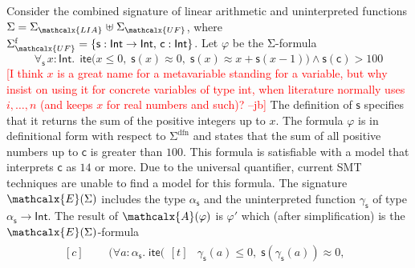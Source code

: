 \documentclass[runningheads,a4paper]{llncs}
\newcommand{\con}[1]{\mathsf{#1}}
\let\const=\con
\let\oldSigma=\Sigma
\def\Sigma{\mathrm{\oldSigma}}
\let\oldwedge=\wedge
\def\wedge{\mathrel{\oldwedge}}
\newcommand{\teq}{\approx}
\newcommand{\conv}{\mathcalx{A}}
\newcommand{\stypes}[1]{#1^\mathrm{ty}}
\newcommand{\sfuns}[1]{#1^\mathrm{f}}
\newcommand{\sfundefs}[1]{#1^\mathrm{dfn}}
\newcommand{\typeint}{\ty{Int}}
\newcommand\ty[1]{\con{#1}}
\newcommand{\lite}{\con{ite}}
\newcommand\concret{\gamma} %
\newcommand{\forallf}[1]{\forall_{\!#1\:}}
\newcommand{\farg}[1]{\concret_{#1}}
\newcommand{\fargtype}[1]{\alpha_{#1}}
\newcommand{\Sigmalia}{\Sigma_{\mathcalx{LIA}}}
\newcommand{\extendsig}[1]{\mathcalx{E}( #1 )}
\newcommand{\rem}[1]{\textcolor{red}{[#1]}}
\newcommand{\jb}[1]{\rem{#1 --jb}}
\newcommand{\ct}[1]{\rem{#1 --ct}}
\newcommand{\euf}{\ensuremath{\mathcalx{UF}}\xspace}
\begin{document}
\begin{example}
\label{ex:translation}
Consider the combined signature of linear arithmetic and uninterpreted
functions $\Sigma = \Sigmalia \mathrel{\uplus} \Sigma_{\euf}$, where
$\sfuns{\Sigma_{\euf}} = \{ \con{s} : { \typeint \rightarrow \typeint },\, \const{c} : { \typeint } \}$.
Let $\varphi$ be the $\Sigma$-formula
\begin{equation} \label{eq:ex-before}
\forallf{\con{s}} x : {\typeint}.\;\, \lite\bigl( x \leq 0,\; \con{s}(x) \teq 0,\;
  \con{s}( x ) \teq x + \con{s}( x - 1 ) \bigr) \wedge \con{s}( \con{c} ) > 100
\end{equation}
%
\jb{I think $x$ is a great name for a metavariable standing for a variable, but
why insist on using it for concrete variables of type int, when literature
normally uses $i, \ldots, n$ (and keeps $x$ for real numbers and such)?}
The definition of $\const{s}$ specifies that it returns the sum of the
positive integers up to $x$. The formula $\varphi$ is in definitional form with
respect to $\sfundefs{\Sigma}$ 
and states that the sum of all
positive numbers up to $\const{c}$ is greater than $100$. This formula is
satisfiable with a model that interprets $\const{c}$ as $14$ or more.
Due to the universal quantifier,
current SMT techniques
are unable to find
a model for this formula. The signature $\extendsig{\Sigma}$ includes the type
$\fargtype{\con{s}}$ and the uninterpreted function $\farg{\con{s}}$ of type $\fargtype{\con{s}}
\rightarrow \typeint$. The result of $\conv( \varphi )$ 
is $\varphi'$ which (after simplification) is the $\extendsig{\Sigma}$-formula
%
\begin{equation} \label{eq:ex-after}
\!\begin{aligned}[c]
  & \phantom{{\wedge}\; }\bigl(
      \forall a : \fargtype{\con{s}}.\; \lite\bigl(
        \!\begin{aligned}[t]
         &  \farg{\con{s}}( a ) \leq 0,\;
          \con{s}(\farg{\con{s}}( a )) \teq 0,\;

\end{aligned}
\end{aligned}
\end{equation}
\end{example}
\end{document}
